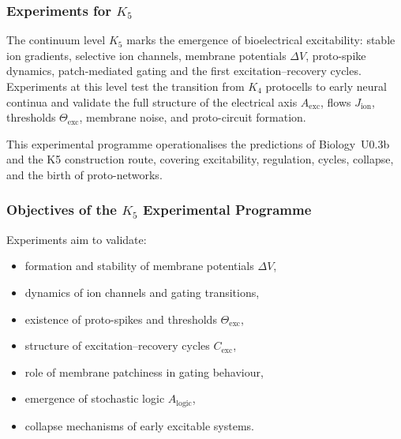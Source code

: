 
\subsubsection{Experiments for \texorpdfstring{$K_5$}{K5}}
\label{sec:experiments-k5}

The continuum level $K_5$ marks the emergence of 
bioelectrical excitability: stable ion gradients, 
selective ion channels, membrane potentials $\Delta V$, 
proto-spike dynamics, patch-mediated gating and the 
first excitation--recovery cycles.  
Experiments at this level test the transition from $K_4$ protocells 
to early neural continua and validate the full structure of 
the electrical axis $A_{\mathrm{exc}}$, flows $J_{\mathrm{ion}}$, 
thresholds $\Theta_{\mathrm{exc}}$, membrane noise, 
and proto-circuit formation.

This experimental programme operationalises the predictions of 
Biology~U0.3b and the K5 construction route, covering excitability, regulation, 
cycles, collapse, and the birth of proto-networks.



\subsubsection{Objectives of the \texorpdfstring{$K_5$}{K5} Experimental Programme}

Experiments aim to validate:

\begin{itemize}
    \item formation and stability of membrane potentials $\Delta V$,
    \item dynamics of ion channels and gating transitions,
    \item existence of proto-spikes and thresholds $\Theta_{\mathrm{exc}}$,
    \item structure of excitation--recovery cycles $C_{\mathrm{exc}}$,
    \item role of membrane patchiness in gating behaviour,
    \item emergence of stochastic logic $A_{\mathrm{logic}}$,
    \item collapse mechanisms of early excitable systems.
\end{itemize}



